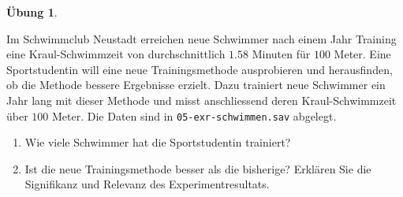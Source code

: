 \documentclass[
]{book}
\providecommand{\tightlist}{%
  \setlength{\itemsep}{0pt}\setlength{\parskip}{0pt}}
\theoremstyle{definition}
\theoremstyle{definition}
\theoremstyle{definition}
\newtheorem{exercise}{Übung}[chapter]
\theoremstyle{definition}
\theoremstyle{remark}
\begin{document}
\begin{exercise}
\protect\hypertarget{exr:schwimmen}{}\label{exr:schwimmen}\leavevmode

Im Schwimmclub Neustadt erreichen neue Schwimmer nach einem Jahr Training eine Kraul-Schwimmzeit von durchschnittlich \(1.58\) Minuten für \(100\) Meter. Eine Sportstudentin will eine neue Trainingsmethode ausprobieren und herausfinden, ob die Methode bessere Ergebnisse erzielt. Dazu trainiert neue Schwimmer ein Jahr lang mit dieser Methode und misst anschliessend deren Kraul-Schwimmzeit über \(100\) Meter. Die Daten sind in \texttt{05-exr-schwimmen.sav} abgelegt.

\begin{enumerate}
\def\labelenumi{\alph{enumi})}
\tightlist
\item
  Wie viele Schwimmer hat die Sportstudentin trainiert?
\item
  Ist die neue Trainingsmethode besser als die bisherige? Erklären Sie die Signifikanz und Relevanz des Experimentresultats.
\end{enumerate}

\end{exercise}
\end{document}
